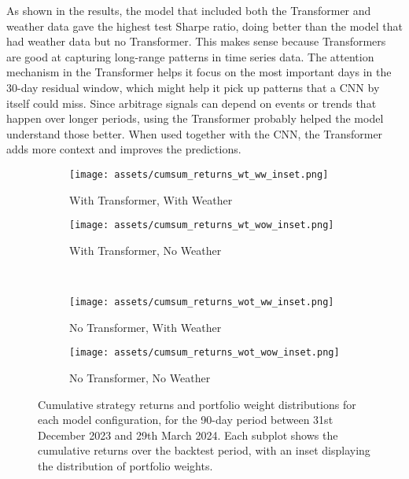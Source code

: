 \documentclass[12pt]{article}
\begin{document}
\vspace{10pt}
\noindent
As shown in the results, the model that included both the Transformer and weather data gave the highest test Sharpe ratio, doing better than the model that had weather data but no Transformer. This makes sense because Transformers are good at capturing long-range patterns in time series data. The attention mechanism in the Transformer helps it focus on the most important days in the 30-day residual window, which might help it pick up patterns that a CNN by itself could miss. Since arbitrage signals can depend on events or trends that happen over longer periods, using the Transformer probably helped the model understand those better. When used together with the CNN, the Transformer adds more context and improves the predictions.

\begin{figure}[htbp]
    \centering
    \begin{subfigure}[b]{0.49\textwidth}
        \texttt{[image: assets/cumsum\_returns\_wt\_ww\_inset.png]}
        \caption{With Transformer, With Weather}
    \end{subfigure}
    \begin{subfigure}[b]{0.49\textwidth}
        \texttt{[image: assets/cumsum\_returns\_wt\_wow\_inset.png]}
        \caption{With Transformer, No Weather}
    \end{subfigure}
    \\
    \begin{subfigure}[b]{0.49\textwidth}
        \texttt{[image: assets/cumsum\_returns\_wot\_ww\_inset.png]}
        \caption{No Transformer, With Weather}
    \end{subfigure}
    \begin{subfigure}[b]{0.49\textwidth}
        \texttt{[image: assets/cumsum\_returns\_wot\_wow\_inset.png]}
        \caption{No Transformer, No Weather}
    \end{subfigure}
    \caption{Cumulative strategy returns and portfolio weight distributions for each model configuration, for the 90-day period between 31st December 2023 and 29th March 2024. Each subplot shows the cumulative returns over the backtest period, with an inset displaying the distribution of portfolio weights.}
    \label{fig:sharpe_grid}
\end{figure}
\end{document}
